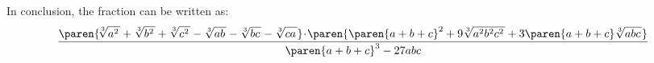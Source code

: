 In conclusion, the fraction can be written as:
\begin{equation*}
  \frac{\paren{ \!
          \sqrt[3]{a^2 \vphantom{b^2 c^2} \mspace{2mu}}
          + \sqrt[3]{b^2 \vphantom{a^2 c^2} \mspace{2mu}}
          + \sqrt[3]{c^2 \vphantom{a^2 b^2} \mspace{2mu}}
          - \sqrt[3]{a b \vphantom{c} \mspace{2mu}}
          - \sqrt[3]{b c \vphantom{a} \mspace{2mu}}
          - \sqrt[3]{c a \vphantom{b} \mspace{2mu}}
        } \! \cdot \!
        \paren{
          \paren{a + b + c}^2
          + 9 \sqrt[3]{a^2 b^2 c^2 \mspace{2mu}}
          + 3 \paren{a + b + c} \sqrt[3]{a b c \mspace{2mu}}
        }}
       {\mspace{1mu} \paren{a + b + c}^3 - 27 a b c \mspace{1mu}}
\end{equation*}
